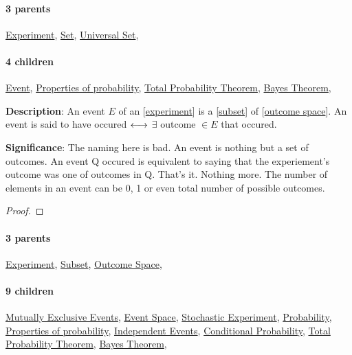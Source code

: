 \documentclass[../main.tex]{subfiles}
\begin{document}
\paragraph{3 parents} \hyperref[statement:Experiment]{Experiment}, \hyperref[statement:Set]{Set}, \hyperref[statement:Universal Set]{Universal Set}, 
\paragraph{4 children} \hyperref[statement:Event]{Event}, \hyperref[statement:Properties of probability]{Properties of probability}, \hyperref[statement:Total Probability Theorem]{Total Probability Theorem}, \hyperref[statement:Bayes Theorem]{Bayes Theorem}, 



\begin{statement}
\label{statement:Event}\hspace*{0pt}\par
\end{statement}
\textbf{Description}:
An event $ E $ of an [\hyperref[statement:Experiment]{experiment}] is a [\hyperref[statement:Subset]{subset}] of [\hyperref[statement:Outcome Space]{outcome space}]. An event is said to have occured $ \longleftrightarrow $ $ \exists $ outcome $ \in E $ that occured.
\par
{\color{magenta} \textbf{Significance}:
The naming here is bad.
An event is nothing but a set of outcomes.
An event Q occured is equivalent to saying that the experiement's outcome was one of outcomes in Q.
That's it.
Nothing more.
The number of elements in an event can be 0, 1 or even total number of possible outcomes.
\par}
\begin{proof}
\proofbydefinition
\end{proof}\par
\paragraph{3 parents} \hyperref[statement:Experiment]{Experiment}, \hyperref[statement:Subset]{Subset}, \hyperref[statement:Outcome Space]{Outcome Space}, 
\paragraph{9 children} \hyperref[statement:Mutually Exclusive Events]{Mutually Exclusive Events}, \hyperref[statement:Event Space]{Event Space}, \hyperref[statement:Stochastic Experiment]{Stochastic Experiment}, \hyperref[statement:Probability]{Probability}, \hyperref[statement:Properties of probability]{Properties of probability}, \hyperref[statement:Independent Events]{Independent Events}, \hyperref[statement:Conditional Probability]{Conditional Probability}, \hyperref[statement:Total Probability Theorem]{Total Probability Theorem}, \hyperref[statement:Bayes Theorem]{Bayes Theorem}, 
\end{document}
